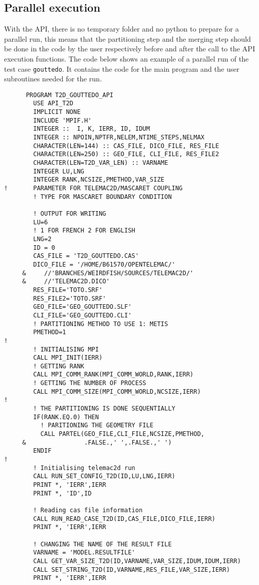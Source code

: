 %
\subsection{Parallel execution}
%
With the API, there is no temporary folder and no python to prepare for a
parallel run, this means that the partitioning step and the merging step should
be done in the code by the user respectively before and after the call to the
API execution functions. The code below shows an example of a parallel run of
the test case \verb!gouttedo!. It contains the code for the main program and
the user subroutines needed for the run.

\begin{lstlisting}
      PROGRAM T2D_GOUTTEDO_API
        USE API_T2D
        IMPLICIT NONE
        INCLUDE 'MPIF.H'
        INTEGER ::  I, K, IERR, ID, IDUM
        INTEGER :: NPOIN,NPTFR,NELEM,NTIME_STEPS,NELMAX
        CHARACTER(LEN=144) :: CAS_FILE, DICO_FILE, RES_FILE
        CHARACTER(LEN=250) :: GEO_FILE, CLI_FILE, RES_FILE2
        CHARACTER(LEN=T2D_VAR_LEN) :: VARNAME
        INTEGER LU,LNG
        INTEGER RANK,NCSIZE,PMETHOD,VAR_SIZE
!       PARAMETER FOR TELEMAC2D/MASCARET COUPLING
        ! TYPE FOR MASCARET BOUNDARY CONDITION
       
        ! OUTPUT FOR WRITING
        LU=6
        ! 1 FOR FRENCH 2 FOR ENGLISH
        LNG=2
        ID = 0
        CAS_FILE = 'T2D_GOUTTEDO.CAS'
        DICO_FILE = '/HOME/B61570/OPENTELEMAC/'
     &     //'BRANCHES/WEIRDFISH/SOURCES/TELEMAC2D/'
     &     //'TELEMAC2D.DICO'
        RES_FILE='TOTO.SRF'
        RES_FILE2='TOTO.SRF'
        GEO_FILE='GEO_GOUTTEDO.SLF'
        CLI_FILE='GEO_GOUTTEDO.CLI'
        ! PARTITIONING METHOD TO USE 1: METIS
        PMETHOD=1
!
        ! INITIALISING MPI
        CALL MPI_INIT(IERR)
        ! GETTING RANK
        CALL MPI_COMM_RANK(MPI_COMM_WORLD,RANK,IERR)
        ! GETTING THE NUMBER OF PROCESS
        CALL MPI_COMM_SIZE(MPI_COMM_WORLD,NCSIZE,IERR)
!
        ! THE PARTITIONING IS DONE SEQUENTIALLY
        IF(RANK.EQ.0) THEN
          ! PARITIONING THE GEOMETRY FILE
          CALL PARTEL(GEO_FILE,CLI_FILE,NCSIZE,PMETHOD,
     &                .FALSE.,' ',.FALSE.,' ')
        ENDIF
!        
        ! Initialising telemac2d run
        CALL RUN_SET_CONFIG_T2D(ID,LU,LNG,IERR)
        PRINT *, 'IERR',IERR
        PRINT *, 'ID',ID

        ! Reading cas file information
        CALL RUN_READ_CASE_T2D(ID,CAS_FILE,DICO_FILE,IERR)
        PRINT *, 'IERR',IERR

        ! CHANGING THE NAME OF THE RESULT FILE
        VARNAME = 'MODEL.RESULTFILE'
        CALL GET_VAR_SIZE_T2D(ID,VARNAME,VAR_SIZE,IDUM,IDUM,IERR)
        CALL SET_STRING_T2D(ID,VARNAME,RES_FILE,VAR_SIZE,IERR)
        PRINT *, 'IERR',IERR
        

\end{lstlisting}
